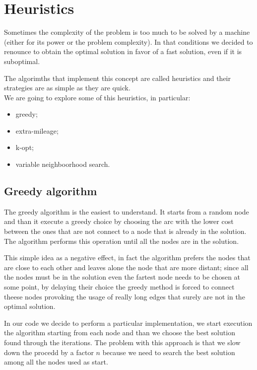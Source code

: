 \section{Heuristics}
Sometimes the complexity of the problem is too much to be solved by a machine (either for its power or the problem complexity). In that conditions we decided to renounce to obtain the optimal solution in favor of a fast solution, even if it is suboptimal.

The algorimths that implement this concept are called heuristics and their strategies are as simple as they are quick. \\
We are going to explore some of this heuristics, in particular:
\begin{itemize}
	\item greedy;
	\item extra-mileage;
	\item k-opt;
	\item variable neighboorhood search.
\end{itemize}

\subsection{Greedy algorithm}
The greedy algorithm is the easiest to understand. It starts from a random node and than it execute a greedy choice by choosing the arc with the lower cost between the ones that are not connect to a node that is already in the solution. The algorithm performs this operation until all the nodes are in the solution.

This simple idea as a negative effect, in fact the algorithm prefers the nodes that are close to each other and leaves alone the node that are more distant; since all the nodes must be in the solution even the fartest node needs to be chosen at some point, by delaying their choice the greedy method is forced to connect theese nodes provoking the usage of really long edges that surely are not in the optimal solution.

In our code we decide to perform a particular implementation, we start execution the algorithm starting from each node and than we choose the best solution found through the iterations. The problem with this approach is that we slow down the procedd by a factor $n$ because we need to search the best solution among all the nodes used as start.


